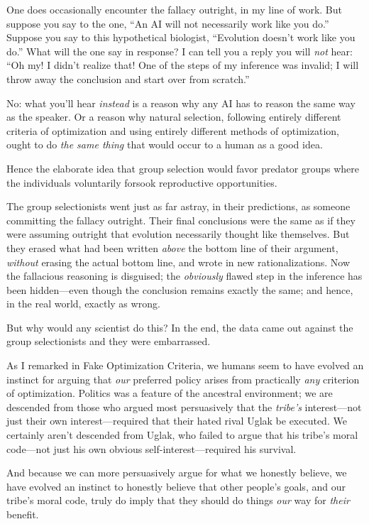 {
 One does occasionally encounter the fallacy outright, in my line
of work. But suppose you say to the one, ``An AI will
not necessarily work like you do.'' Suppose you say
to this hypothetical biologist, ``Evolution
doesn't work like you do.'' What will
the one say in response? I can tell you a reply you will \textit{not}
hear: ``Oh my! I didn't realize that!
One of the steps of my inference was invalid; I will throw away the
conclusion and start over from scratch.''}

{
 No: what you'll hear \textit{instead} is a reason
why any AI has to reason the same way as the speaker. Or a reason why
natural selection, following entirely different criteria of
optimization and using entirely different methods of optimization,
ought to do \textit{the same thing} that would occur to a human as a
good idea.}

{
 Hence the elaborate idea that group selection would favor predator
groups where the individuals voluntarily forsook reproductive
opportunities.}

{
 The group selectionists went just as far astray, in their
predictions, as someone committing the fallacy outright. Their final
conclusions were the same as if they were assuming outright that
evolution necessarily thought like themselves. But they erased what had
been written \textit{above} the bottom line of their argument,
\textit{without} erasing the actual bottom line, and wrote in new
rationalizations. Now the fallacious reasoning is disguised; the
\textit{obviously} flawed step in the inference has been hidden---even
though the conclusion remains exactly the same; and hence, in the real
world, exactly as wrong.}

{
 But why would any scientist do this? In the end, the data came out
against the group selectionists and they were embarrassed.}

{
 As I remarked in Fake Optimization Criteria, we humans seem to
have evolved an instinct for arguing that \textit{our} preferred policy
arises from practically \textit{any} criterion of optimization.
Politics was a feature of the ancestral environment; we are descended
from those who argued most persuasively that the
\textit{tribe's} interest---not just their own
interest---required that their hated rival Uglak be executed. We
certainly aren't descended from Uglak, who failed to
argue that his tribe's moral code{}---not just his own
obvious self-interest---required his survival.}

{
 And because we can more persuasively argue for what we honestly
believe, we have evolved an instinct to honestly believe that other
people's goals, and our tribe's moral
code, truly do imply that they should do things \textit{our} way for
\textit{their} benefit.}

